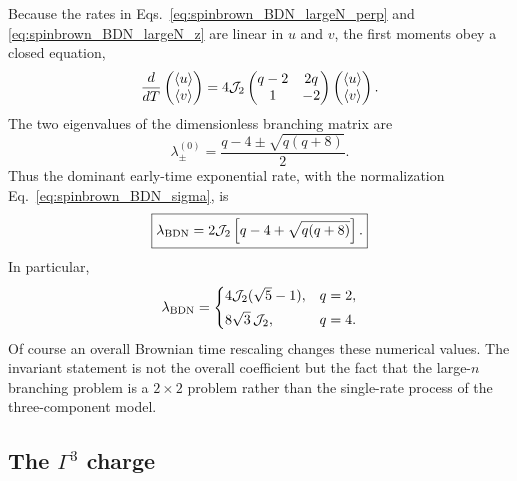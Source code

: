 \documentclass{article}
\theoremstyle{definition}
\begin{document}
Because the rates in
Eqs.~\eqref{eq:spinbrown_BDN_largeN_perp} and
\eqref{eq:spinbrown_BDN_largeN_z} are linear in $u$ and $v$, the first
moments obey a closed equation,
\begin{equation}
    \frac{d}{dT}
    \begin{pmatrix}
       \langle u\rangle\\
       \langle v\rangle
    \end{pmatrix}
    =
    4{\cal J}_2
    \begin{pmatrix}
       q-2 & 2q\\
       1   & -2
    \end{pmatrix}
    \begin{pmatrix}
       \langle u\rangle\\
       \langle v\rangle
    \end{pmatrix}.
    \label{eq:spinbrown_BDN_branching_matrix}
\end{equation}
The two eigenvalues of the dimensionless branching matrix are
\begin{equation}
    \lambda_\pm^{(0)}
    =
    \frac{
       q-4
       \pm
       \sqrt{q(q+8)}
    }{2}.
\end{equation}
Thus the dominant early-time exponential rate, with the normalization
Eq.~\eqref{eq:spinbrown_BDN_sigma}, is
\begin{equation}
    \boxed{
    \lambda_{\rm BDN}
    =
    2{\cal J}_2
    \left[
       q-4+\sqrt{q(q+8)}
    \right].
    }
    \label{eq:spinbrown_BDN_lambda}
\end{equation}
In particular,
\begin{equation}
    \lambda_{\rm BDN}
    =
    \begin{cases}
       4{\cal J}_2(\sqrt5-1), & q=2,\\[1mm]
       8\sqrt3\,{\cal J}_2, & q=4.
    \end{cases}
    \label{eq:spinbrown_BDN_lambda_q24}
\end{equation}
Of course an overall Brownian time rescaling changes these numerical
values.  The invariant statement is not the overall coefficient but the
fact that the large-$n$ branching problem is a $2\times2$ problem rather
than the single-rate process of the three-component model.


\subsection{The $\Gamma^3$ charge}
\label{subsec:spinbrown_BDN_charge}
\end{document}
